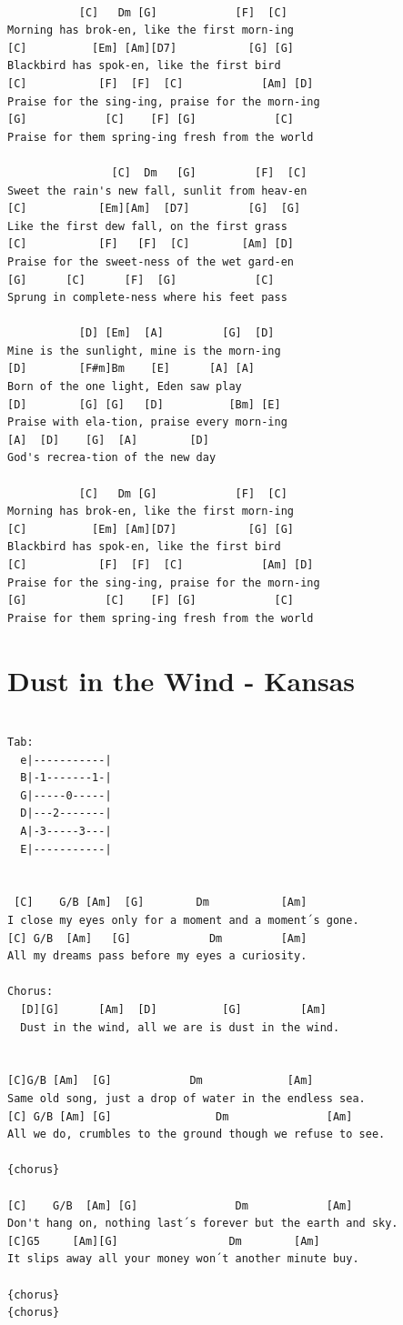 \documentclass[
]{book}
\let\stdsection\section
\renewcommand\section{\clearpage\stdsection}
\begin{document}
\begin{verbatim}

           [C]   Dm [G]            [F]  [C]
Morning has brok-en, like the first morn-ing
[C]          [Em] [Am][D7]           [G] [G]
Blackbird has spok-en, like the first bird
[C]           [F]  [F]  [C]            [Am] [D]
Praise for the sing-ing, praise for the morn-ing
[G]            [C]    [F] [G]            [C]
Praise for them spring-ing fresh from the world

                [C]  Dm   [G]         [F]  [C]
Sweet the rain's new fall, sunlit from heav-en
[C]           [Em][Am]  [D7]         [G]  [G]
Like the first dew fall, on the first grass
[C]           [F]   [F]  [C]        [Am] [D]
Praise for the sweet-ness of the wet gard-en
[G]      [C]      [F]  [G]            [C]
Sprung in complete-ness where his feet pass

           [D] [Em]  [A]         [G]  [D]
Mine is the sunlight, mine is the morn-ing
[D]        [F#m]Bm    [E]      [A] [A]
Born of the one light, Eden saw play
[D]        [G] [G]   [D]          [Bm] [E]
Praise with ela-tion, praise every morn-ing
[A]  [D]    [G]  [A]        [D]
God's recrea-tion of the new day

           [C]   Dm [G]            [F]  [C]
Morning has brok-en, like the first morn-ing
[C]          [Em] [Am][D7]           [G] [G]
Blackbird has spok-en, like the first bird
[C]           [F]  [F]  [C]            [Am] [D]
Praise for the sing-ing, praise for the morn-ing
[G]            [C]    [F] [G]            [C]
Praise for them spring-ing fresh from the world
\end{verbatim}

\hypertarget{dust-in-the-wind---kansas}{%
\section{Dust in the Wind - Kansas}\label{dust-in-the-wind---kansas}}

\begin{verbatim}

Tab:
  e|-----------|
  B|-1-------1-|
  G|-----0-----|
  D|---2-------|
  A|-3-----3---|
  E|-----------|


 [C]    G/B [Am]  [G]        Dm           [Am]
I close my eyes only for a moment and a moment´s gone.
[C] G/B  [Am]   [G]            Dm         [Am]
All my dreams pass before my eyes a curiosity.

Chorus:
  [D][G]      [Am]  [D]          [G]         [Am]
  Dust in the wind, all we are is dust in the wind.


[C]G/B [Am]  [G]            Dm             [Am]
Same old song, just a drop of water in the endless sea.
[C] G/B [Am] [G]                Dm               [Am]
All we do, crumbles to the ground though we refuse to see.

{chorus}

[C]    G/B  [Am] [G]               Dm            [Am]
Don't hang on, nothing last´s forever but the earth and sky.
[C]G5     [Am][G]                 Dm        [Am]
It slips away all your money won´t another minute buy.

{chorus}
{chorus}

\end{verbatim}
\end{document}

